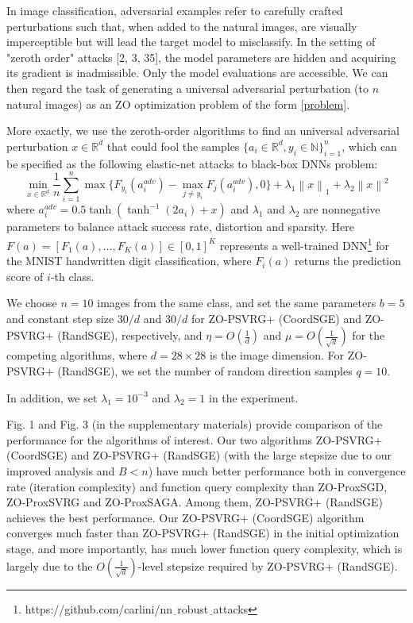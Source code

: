 \documentclass{article}
\newcommand*{\R}{\mathbb{R}}
\newcommand{\norm}[1]{\left\lVert#1\right\rVert}
\theoremstyle{definition}
\theoremstyle{remark}
\begin{document}
{\color{Brown}
In image classification, adversarial
examples refer to carefully crafted perturbations such that, when added to the natural images, are
visually imperceptible but will lead the target model to misclassify. In the setting of "zeroth order"
attacks [2, 3, 35], the model parameters are hidden and acquiring its gradient is inadmissible. Only
the model evaluations are accessible. We can then regard the task of generating a universal adversarial
perturbation (to $n$ natural images) as an ZO optimization problem of the form \eqref{problem}.
{\color{Green}
More exactly,
we use the zeroth-order algorithms to find an universal adversarial perturbation $x\in\R^d$ that could fool the samples $\{a_i \in \R^d, y_i\in\mathbb{N} \}_{i=1}^n$, which can be specified as the following elastic-net attacks to black-box DNNs problem:
\begin{equation}
\min_{x\in\R^d} \frac{1}{n} \sum_{i=1}^n \max\{F_{y_i}(a_i^{adv}) - \max_{j\neq y_i}F_j(a_i^{adv}),0\} + \lambda_1 \norm{x}_{1} + \lambda_2 \norm{x}^{2}
\end{equation}
where $a_i^{adv} = 0.5\tanh(\tanh^{-1}(2a_i)+x)$ and $\lambda_1$ and $\lambda_2$ are nonnegative parameters to balance attack success rate, distortion and sparsity. Here $F(a) = \left[F_1(a),\ldots,F_K(a)\right]\in [0, 1]^K$ represents a well-trained DNN{\footnote{https://github.com/carlini/nn$\underline{~~}$robust$\underline{~~}$attacks}} for the MNIST handwritten digit classification, where $F_i(a)$ returns the prediction score of $i$-th class.

}

We choose $n = 10$ images from the same class, and set the same
parameters $b = 5$ and constant step size {\color{red} $30/d$} and {\color{red} $30/d$} for ZO-PSVRG+ (CoordSGE) and ZO-PSVRG+ (RandSGE), respectively, and $\eta = O(\frac{1}{d})$ and $\mu = O(\frac{1}{\sqrt{d}})$ for the competing algorithms, where $d = 28 \times 28$ is the image
dimension. For ZO-PSVRG+ (RandSGE), we set the number of random direction samples
$q = 10$.


{\color{Green}
In addition, we set $\lambda_1 = 10^{-3}$ and $\lambda_2 = 1$ in the experiment.
}
}
{\color{Melon}
Fig. 1 and Fig. 3 (in the supplementary materials) provide
comparison of the performance for the algorithms of interest.
Our two algorithms ZO-PSVRG+ (CoordSGE) and ZO-PSVRG+ (RandSGE) (with the large stepsize due to our improved analysis and $B < n$) have much better performance
both in convergence rate (iteration complexity) and
function query complexity than ZO-ProxSGD, ZO-ProxSVRG
and ZO-ProxSAGA. Among them, ZO-PSVRG+ (RandSGE)
achieves the best performance. Our ZO-PSVRG+ (CoordSGE)
algorithm converges much faster than ZO-PSVRG+ (RandSGE)
in the initial optimization stage, and more importantly, has
much lower function query complexity, which is largely
due to the $O(\frac{1}{\sqrt{d}})$-level stepsize required by ZO-PSVRG+ (RandSGE).
}
\end{document}
